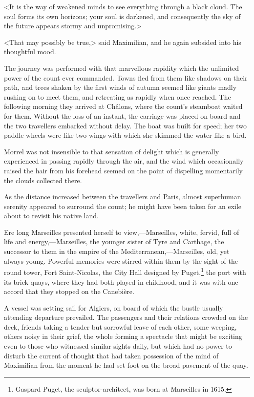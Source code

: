  <It is the way of weakened minds to see everything through a black cloud. The soul forms its own horizons; your soul is darkened, and consequently the sky of the future appears stormy and unpromising.> 

 <That may possibly be true,> said Maximilian, and he again subsided into his thoughtful mood. 

 The journey was performed with that marvellous rapidity which the unlimited power of the count ever commanded. Towns fled from them like shadows on their path, and trees shaken by the first winds of autumn seemed like giants madly rushing on to meet them, and retreating as rapidly when once reached. The following morning they arrived at Châlons, where the count's steamboat waited for them. Without the loss of an instant, the carriage was placed on board and the two travellers embarked without delay. The boat was built for speed; her two paddle-wheels were like two wings with which she skimmed the water like a bird. 

 Morrel was not insensible to that sensation of delight which is generally experienced in passing rapidly through the air, and the wind which occasionally raised the hair from his forehead seemed on the point of dispelling momentarily the clouds collected there. 

 As the distance increased between the travellers and Paris, almost superhuman serenity appeared to surround the count; he might have been taken for an exile about to revisit his native land. 

 Ere long Marseilles presented herself to view,—Marseilles, white, fervid, full of life and energy,—Marseilles, the younger sister of Tyre and Carthage, the successor to them in the empire of the Mediterranean,—Marseilles, old, yet always young. Powerful memories were stirred within them by the sight of the round tower, Fort Saint-Nicolas, the City Hall designed by Puget,\footnote{Gaspard Puget, the sculptor-architect, was born at Marseilles in 1615. } the port with its brick quays, where they had both played in childhood, and it was with one accord that they stopped on the Canebière. 

 A vessel was setting sail for Algiers, on board of which the bustle usually attending departure prevailed. The passengers and their relations crowded on the deck, friends taking a tender but sorrowful leave of each other, some weeping, others noisy in their grief, the whole forming a spectacle that might be exciting even to those who witnessed similar sights daily, but which had no power to disturb the current of thought that had taken possession of the mind of Maximilian from the moment he had set foot on the broad pavement of the quay. 

